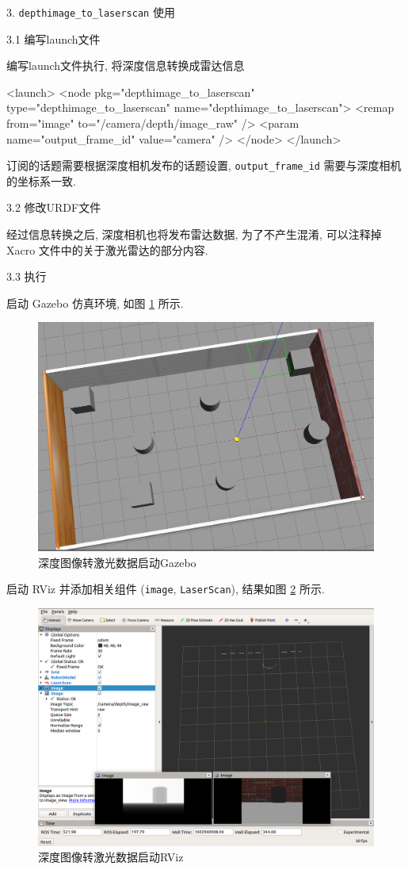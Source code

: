 \documentclass[openany, fontset=windowsold]{ctexbook}
\theoremstyle{kaiti}
\theoremstyle{normal}
\begin{document}
3. \verb|depthimage_to_laserscan| 使用

3.1 编写launch文件

编写launch文件执行, 将深度信息转换成雷达信息

\begin{xml}
  <launch>
      <node pkg="depthimage_to_laserscan" type="depthimage_to_laserscan" name="depthimage_to_laserscan">
          <remap from="image" to="/camera/depth/image_raw" />
          <param name="output_frame_id" value="camera"  />
      </node>
  </launch>
\end{xml}

订阅的话题需要根据深度相机发布的话题设置, \verb|output_frame_id| 需要与深度相机的坐标系一致.

3.2 修改URDF文件

经过信息转换之后, 深度相机也将发布雷达数据, 为了不产生混淆, 可以注释掉 Xacro 文件中的关于激光雷达的部分内容.

3.3 执行

启动 Gazebo 仿真环境, 如图 \ref{fig:ros_demo_nav_img_to_scan_start_gazebo} 所示.

\begin{figure}[!ht]
  \centering
  \includegraphics[width=.8\textwidth]{ros_demo_nav_img_to_scan_start_gazebo.png}
  \caption{深度图像转激光数据启动Gazebo}
  \label{fig:ros_demo_nav_img_to_scan_start_gazebo}
\end{figure}

启动 RViz 并添加相关组件 (\verb|image|, \verb|LaserScan|), 结果如图 \ref{fig:ros_demo_nav_img_to_scan_rviz} 所示.

\begin{figure}[!ht]
  \centering
  \includegraphics[width=.8\textwidth]{ros_demo_nav_img_to_scan_rviz.png}
  \caption{深度图像转激光数据启动RViz}
  \label{fig:ros_demo_nav_img_to_scan_rviz}
\end{figure}
\end{document}
